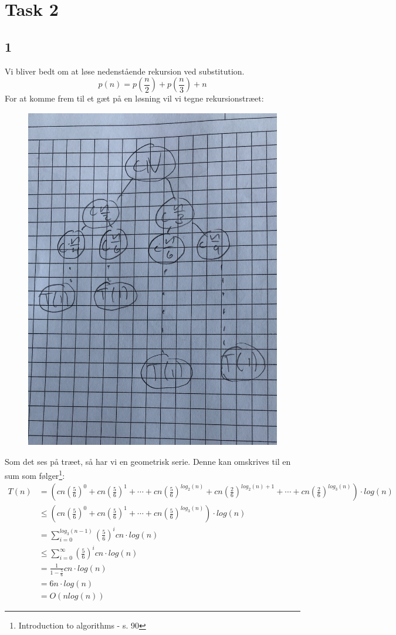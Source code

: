 \section{Task 2}

\subsection{1}
Vi bliver bedt om at løse nedenstående rekursion ved substitution.
\begin{equation*}
	p(n) = p(\frac{n}{2}) + p(\frac{n}{3}) + n
\end{equation*}
For at komme frem til et gæt på en løsning vil vi tegne rekursionstræet:
\begin{figure}[h]
	\centering
	\includegraphics[height=15cm]{Materials/RecTree}
\end{figure}

Som det ses på træet, så har vi en geometrisk serie. Denne kan omskrives til en sum som følger\footnote{Introduction to algorithms - s. 90}:
\begin{align*}
	T(n) &= \left(cn\left(\frac{5}{6}\right)^0 + cn\left(\frac{5}{6}\right)^1 + \cdots + cn\left(\frac{5}{6}\right)^{log_2(n)} + cn\left(\frac{2}{6}\right)^{log_2(n)+1} + \cdots + cn\left(\frac{2}{6}\right)^{log_3(n)}\right)  \cdot log(n)\\
	&\leq \left(cn\left(\frac{5}{6}\right)^0 + cn\left(\frac{5}{6}\right)^1 + \cdots + cn\left(\frac{5}{6}\right)^{log_3(n)}\right) \cdot log(n)\\
	&= \sum_{i = 0}^{log_{3}(n-1)}\left(\frac{5}{6}\right)^icn \cdot log(n)\\
	&\leq \sum_{i = 0}^{\infty}\left(\frac{5}{6}\right)^icn \cdot log(n)\\
	&= \frac{1}{1-\frac{5}{6}}cn \cdot log(n)\\
	&= 6n\cdot log(n)\\
	&= O(nlog(n))
\end{align*}

